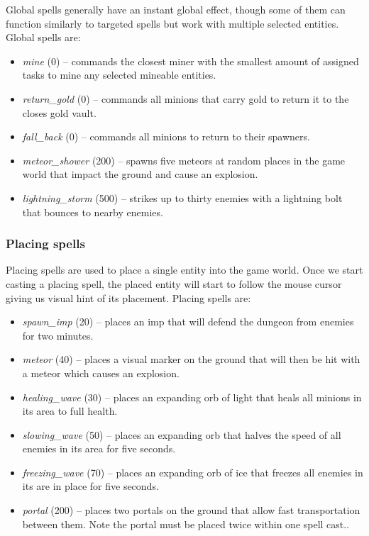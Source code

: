 Global spells generally have an instant global effect, though some of them can function similarly to targeted spells but work with
multiple selected entities. Global spells are:

\begin{itemize}
    \item \emph{mine} (0) -- commands the closest miner with the smallest amount of assigned tasks to mine any selected
        mineable entities.
    \item \emph{return\_gold} (0) -- commands all minions that carry gold to return it to the closes gold vault.
    \item \emph{fall\_back} (0) -- commands all minions to return to their spawners.
    \item \emph{meteor\_shower} (200) -- spawns five meteors at random places in the game world that impact the ground and cause
        an explosion.
    \item \emph{lightning\_storm} (500) -- strikes up to thirty enemies with a lightning bolt that bounces to nearby enemies.
\end{itemize}

\subsubsection{Placing spells}

Placing spells are used to place a single entity into the game world. Once we start casting a placing spell, the placed entity will start
to follow the mouse cursor giving us visual hint of its placement. Placing spells are:

\begin{itemize}
    \item \emph{spawn\_imp} (20) -- places an imp that will defend the dungeon from enemies for two minutes.
    \item \emph{meteor} (40) -- places a visual marker on the ground that will then be hit with a meteor which causes an explosion.
    \item \emph{healing\_wave} (30) -- places an expanding orb of light that heals all minions in its area to full health.
    \item \emph{slowing\_wave} (50) -- places an expanding orb that halves the speed of all enemies in its area for five seconds.
    \item \emph{freezing\_wave} (70) -- places an expanding orb of ice that freezes all enemies in its are in place for five seconds.
    \item \emph{portal} (200) -- places two portals on the ground that allow fast transportation between them. Note the portal must be
        placed twice within one spell cast..
\end{itemize}

